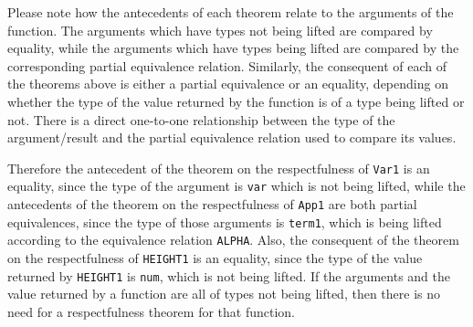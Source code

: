 \documentclass[envcountsame,runningheads]{llncs}
\newcommand{\quotient}{partial equivalence}
\begin{document}
%
%


Please note how the antecedents of each theorem relate to the arguments
of the function.  The arguments which have types not being lifted
are compared by equality, while the arguments which have types being lifted
are compared by the corresponding \quotient{} relation.  Similarly, the
consequent of each of the theorems above is either a \quotient{} or an
equality, depending on whether the type of the value returned by the
function is of a type being lifted or not.  There is a direct one-to-one
relationship between the type of the argument/result and the
\quotient{} relation used to compare its values.

Therefore the antecedent of the theorem on the respectfulness of {\tt Var1}
is an equality, since the type of the argument is {\tt var} which is not
being lifted, while the antecedents of the theorem on the respectfulness
of {\tt App1} are both \quotient{}s, since the type of those arguments is
{\tt term1}, which is being lifted according to the equivalence relation
{\tt ALPHA}.  Also, the consequent of the theorem on the respectfulness
of {\tt HEIGHT1} is an equality, since the type of the value returned
by {\tt HEIGHT1} is {\tt num}, which is not being lifted.  If the
arguments and the value returned by a function are all of types
not being lifted, then there is no need for a respectfulness theorem
for that function.
\end{document}
